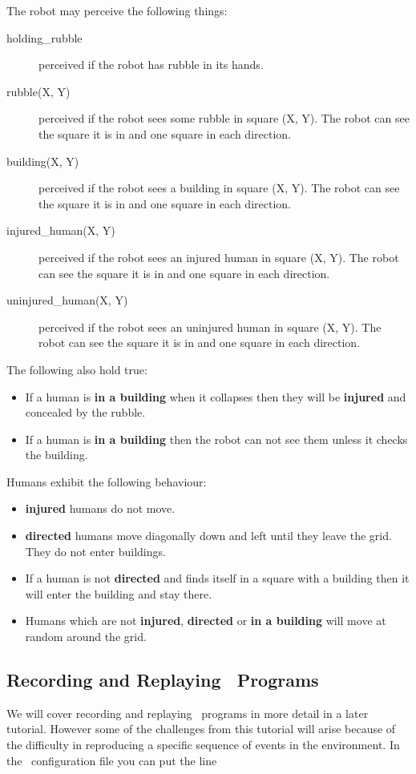 The robot may perceive the following things:
\begin{description}
\item[holding\_rubble] perceived if the robot has rubble in its hands.
\item[rubble(X, Y)] perceived if the robot sees some rubble in square (X, Y).  The robot can see the square it is in and one square in each direction.
\item[building(X, Y)] perceived if the robot sees a building in square (X, Y).  The robot can see the square it is in and one square in each direction.
\item[injured\_human(X, Y)] perceived if the robot sees an injured human in square (X, Y).  The robot can see the square it is in and one square in each direction.
\item[uninjured\_human(X, Y)] perceived if the robot sees an uninjured human in square (X, Y).  The robot can see the square it is in and one square in each direction.
\end{description}

The following also hold true:
\begin{itemize}
\item If a human is {\bf in a building} when it collapses then they will be {\bf injured} and concealed by the rubble.
\item If a human is {\bf in a building} then the robot can not see them unless it checks the building.
\end{itemize}

Humans exhibit the following behaviour:
\begin{itemize}
\item {\bf injured} humans do not move.
\item {\bf directed} humans move diagonally down and left until they leave the grid.  They do not enter buildings.
\item If a human is not {\bf directed} and finds itself in a square with a building then it will enter the building and stay there.
\item Humans which are not {\bf injured}, {\bf directed} or {\bf in a building} will move at random around the grid.
\end{itemize}

\subsection{Recording and Replaying \ail\ Programs}
We will cover recording and replaying \ail\ programs in more detail in
a later tutorial.  However some of the challenges from this tutorial
will arise because of the difficulty in reproducing a specific
sequence of events in the environment.  In the \ail\ configuration
file you can put the line 


